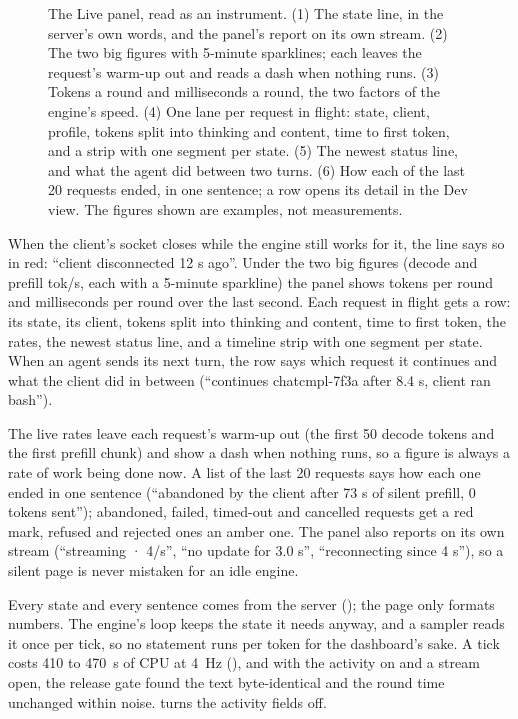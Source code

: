\begin{figure}[htbp]
\centering

\caption[The Live panel as an instrument readout]{The Live panel, read as an instrument. (1) The state line, in the server's own words, and the panel's report on its own stream. (2) The two big figures with 5-minute sparklines; each leaves the request's warm-up out and reads a dash when nothing runs. (3) Tokens a round and milliseconds a round, the two factors of the engine's speed. (4) One lane per request in flight: state, client, profile, tokens split into thinking and content, time to first token, and a strip with one segment per state. (5) The newest status line, and what the agent did between two turns. (6) How each of the last 20 requests ended, in one sentence; a row opens its detail in the Dev view. The figures shown are examples, not measurements.}\label{fig:live-panel}
\end{figure}

When the client's socket closes while the engine still works for it, the line says so in red: \enquote{client disconnected 12 s ago}. Under the two big figures (decode and prefill tok/s, each with a 5-minute sparkline) the panel shows tokens per round and milliseconds per round over the last second. Each request in flight gets a row: its state, its client, tokens split into thinking and content, time to first token, the rates, the newest status line, and a timeline strip with one segment per state. When an agent sends its next turn, the row says which request it continues and what the client did in between (\enquote{continues chatcmpl-7f3a after 8.4 s, client ran bash}).

The live rates leave each request's warm-up out (the first 50 decode tokens and the first prefill chunk) and show a dash when nothing runs, so a figure is always a rate of work being done now. A list of the last 20 requests says how each one ended in one sentence (\enquote{abandoned by the client after 73 s of silent prefill, 0 tokens sent}); abandoned, failed, timed-out and cancelled requests get a red mark, refused and rejected ones an amber one. The panel also reports on its own stream (\enquote{streaming · 4/s}, \enquote{no update for 3.0 s}, \enquote{reconnecting since 4 s}), so a silent page is never mistaken for an idle engine.

Every state and every sentence comes from the server (); the page only formats numbers. The engine's loop keeps the state it needs anyway, and a sampler reads it once per tick, so no statement runs per token for the dashboard's sake. A tick costs 410 to 470~\textmu s of CPU at 4~Hz (\measured), and with the activity on and a stream open, the release gate found the text byte-identical and the round time unchanged within noise.  turns the activity fields off.

